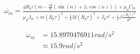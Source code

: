 \documentclass[main.tex]{subfiles}
\begin{document}
\begin{equation}
\begin{split}
\dot{\omega_m} = \frac{gR_p\tau(m -\frac{M}{2}(\sin(\alpha) + f_v\cos(\alpha))) + \mu_{d}C_m}{\mu_{d}J_m  + m(R_p\tau)^2 + \frac{1}{4}M(R_p\tau)^2 + J_p \tau^2 + \frac{1}{4}J \frac{(R_p\tau)^2}{R^2}}
\end{split}
\end{equation}

\begin{align*}
  \dot{\omega}_m &= 15.8970476911 rad/s^2 \\
  &\approx 15.9 rad/s^2
\end{align*}


\clearpage
\end{document}

